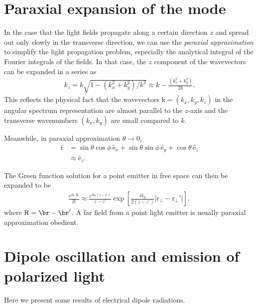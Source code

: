 \documentclass[]{report}
\begin{document}
\section{Paraxial expansion of the mode}
In the case that the light fields propagate along a certain direction $ z $ and spread out only slowly in the transverse direction, we can use the \textit{paraxial approximation} to simplify the light propagation problem, especially the analytical integral of the Fourier integrals of the fields. In that case, the $ z $ component of the wavevectors can be expanded in a series as
\begin{align}
k_z=k\sqrt{1-(k^2_x+k^2_y)/k^2}\approx k-\frac{(k^2_x+k^2_y)}{2k}.
\end{align}
This reflects the physical fact that the wavevectors $ \mathrm{k}=(k_x,k_y,k_z) $ in the angular spectrum representation are almost parallel to the $ z $-axis and the transverse wavenumbers $ (k_x,k_y) $ are small compared to $ k $. 

Meanwhile, in paraxial approximation $ \theta\rightarrow 0 $,
\begin{align}
\hat{\mathrm{r}} &= \sin\theta\cos\phi \, \hat{\mathrm{e}}_x + \sin\theta \sin\phi\, \hat{\mathrm{e}}_y + \cos\theta \, \hat{\mathrm{e}}_z\\
&\approx \hat{\mathrm{e}}_z.
\end{align}

The Green function solution for a point emitter in free space can then be expanded to be
\begin{align}
\frac{e^{i\mathrm{k}\cdot \mathrm{R}}}{R}\approx \frac{e^{ik_0(z-z')}}{z-z'}\exp\left[ \frac{ik_0}{2(z-z')} \left| \mathrm{r}_\perp - \mathrm{r}_\perp'\right| \right],
\end{align}
where $ \mathrm{R}=\br-\br' $. 
A far field from a point light emitter is usually paraxial approximation obedient. 







\section{Dipole oscillation and emission of polarized light}
Here we present some results of electrical dipole radiations.
\end{document}
